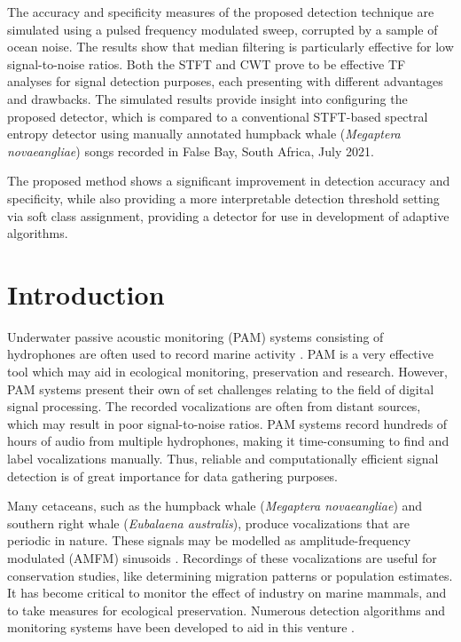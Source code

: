The accuracy and specificity measures of the proposed detection technique are simulated using a pulsed frequency modulated sweep, corrupted by a sample of ocean noise. The results show that median filtering is particularly effective for low signal-to-noise ratios. Both the STFT and CWT prove to be effective TF analyses for signal detection purposes, each presenting with different advantages and drawbacks. The simulated results provide insight into configuring the proposed detector, which is compared to a conventional STFT-based spectral entropy detector using manually annotated humpback whale (\textit{Megaptera novaeangliae}) songs recorded in False Bay, South Africa, July 2021.

The proposed method shows a significant improvement in detection accuracy and specificity, while also providing a more interpretable detection threshold setting via soft class assignment, providing a detector for use in development of adaptive algorithms.

\section{Introduction}

Underwater passive acoustic monitoring (PAM) systems consisting of hydrophones are often 
used to record marine activity \citep{hydrophone, internalsignaldetection, dolphindetection}. 
PAM is a very effective tool which may aid in ecological monitoring, preservation and
research. However, PAM systems present their own of set challenges relating 
to the field of digital signal processing. The recorded vocalizations are often 
from distant sources, which may result in poor signal-to-noise ratios. 
PAM systems record hundreds of hours of audio from multiple hydrophones, 
making it time-consuming to find and label vocalizations manually. Thus, 
reliable and computationally efficient signal detection is of great 
importance for data gathering purposes.

Many cetaceans, such as the humpback whale (\textit{Megaptera novaeangliae}) and southern right whale (\textit{Eubalaena australis}), produce vocalizations that are periodic in nature. These signals may be modelled as amplitude-frequency modulated (AMFM) sinusoids \citep{whalemodel}. Recordings of these vocalizations are useful for conservation studies, like determining migration patterns or population estimates. It has become critical to monitor the effect of industry on marine mammals, and to take measures for ecological preservation. Numerous detection algorithms and monitoring systems have been developed to aid in this venture \citep{glider, rightdetection}.

